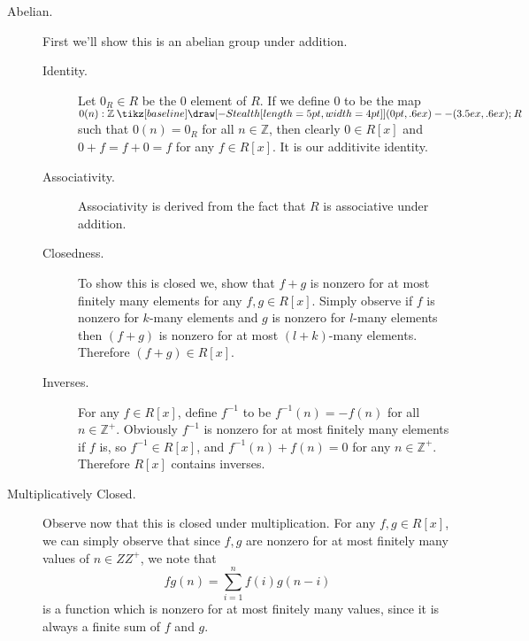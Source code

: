 \documentclass[12pt,letterpaper]{algebra_book}
\renewcommand{\to}{\mathbin{\tikz[baseline] \draw[-{Stealth[length=5pt,width=4pt]}] (0pt,.6ex) -- (3.5ex,.6ex);}}
\newcommand{\ZZ}{\mathbb{Z}}
\theoremstyle{definition}
\begin{document}
    \begin{description}
        \item[Abelian.] First we'll show this is an abelian group
        under addition.
        \begin{description}
            \item[Identity.]Let $0_R \in R$ be the 0 element of $R$.
            If we define 0 to be
            the map $0(n) : \mathbb{Z} \to R$ such that $0(n) = 0_R$
            for all $n \in \mathbb{Z}$, then clearly $0 \in R[x]$ and
            $0 + f = f + 0 = f$ for any $f \in R[x]$. It is our
            additivite identity. 

            \item[Associativity.] Associativity is derived from
            the fact that $R$ is associative under addition.

            \item[Closedness.] 
            To show this is closed we, show that $f + g$ is nonzero
            for at most finitely many elements for any $f, g \in
            R[x]$. Simply observe if $f$ is nonzero for $k$-many
            elements and $g$ is nonzero 
            for $l$-many elements then $(f + g)$ is nonzero for at
            most $(l + k)$-many elements. Therefore $(f + g) \in R[x]$.

            \item[Inverses.] 
            For any $f \in R[x]$, define $f^{-1}$ to be $f^{-1}(n)
            = -f(n)$ for all $n \in \ZZ^{+}$. Obviously $f^{-1}$
            is nonzero for at most finitely many elements if $f$
            is, so $f^{-1} \in R[x]$, and $f^{-1}(n) + f(n) = 0$
            for any $n \in \ZZ^{+}$. Therefore $R[x]$ contains inverses.  
        \end{description} 

        \item[Multiplicatively Closed.]
        Observe now that this is closed under multiplication. For
        any $f, g \in R[x]$, we can simply observe that since $f,
        g$ are nonzero for at most finitely many values of $n \in
        ZZ^{+}$, we note that 
        \[
            fg(n) = \sum_{i = 1}^{n}f(i)g(n - i)
        \]
        is a function which is nonzero for at most finitely many
        values, since it is always a finite sum of $f$ and $g$.


\end{description}
\end{document}

